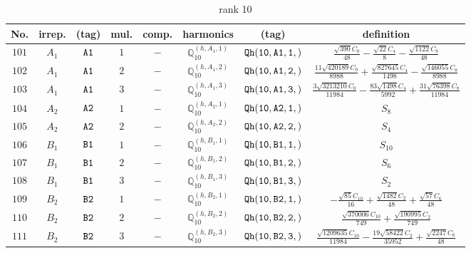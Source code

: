 \documentclass[fleqn,8pt]{jsarticle}
\begin{document}
\begin{table}[ht!]
\begin{center}
\caption{rank 10}
\renewcommand{\arraystretch}{1.3}
\begin{tabular}{cccccccc} \hline \hline
No. & irrep. & (tag) & mul. & comp. & harmonics & (tag) & definition \\ \hline
$ 101 $ & $ A_{1} $ & $ {\tt A1} $ & $ 1 $ & $ - $ & $ \mathbb{Q}_{10}^{(h,A_{1},1)} $ & $ {\tt Qh(10,A1,1,)} $ & $ \frac{\sqrt{390} C_{0}}{48} - \frac{\sqrt{22} C_{4}}{8} - \frac{\sqrt{1122} C_{8}}{48} $ \\
$ 102 $ & $ A_{1} $ & $ {\tt A1} $ & $ 2 $ & $ - $ & $ \mathbb{Q}_{10}^{(h,A_{1},2)} $ & $ {\tt Qh(10,A1,2,)} $ & $ \frac{11 \sqrt{420189} C_{0}}{8988} + \frac{\sqrt{827645} C_{4}}{1498} - \frac{\sqrt{146055} C_{8}}{8988} $ \\
$ 103 $ & $ A_{1} $ & $ {\tt A1} $ & $ 3 $ & $ - $ & $ \mathbb{Q}_{10}^{(h,A_{1},3)} $ & $ {\tt Qh(10,A1,3,)} $ & $ \frac{3 \sqrt{3213210} C_{0}}{11984} - \frac{83 \sqrt{1498} C_{4}}{5992} + \frac{31 \sqrt{76398} C_{8}}{11984} $ \\
$ 104 $ & $ A_{2} $ & $ {\tt A2} $ & $ 1 $ & $ - $ & $ \mathbb{Q}_{10}^{(h,A_{2},1)} $ & $ {\tt Qh(10,A2,1,)} $ & $ S_{8} $ \\
$ 105 $ & $ A_{2} $ & $ {\tt A2} $ & $ 2 $ & $ - $ & $ \mathbb{Q}_{10}^{(h,A_{2},2)} $ & $ {\tt Qh(10,A2,2,)} $ & $ S_{4} $ \\
$ 106 $ & $ B_{1} $ & $ {\tt B1} $ & $ 1 $ & $ - $ & $ \mathbb{Q}_{10}^{(h,B_{1},1)} $ & $ {\tt Qh(10,B1,1,)} $ & $ S_{10} $ \\
$ 107 $ & $ B_{1} $ & $ {\tt B1} $ & $ 2 $ & $ - $ & $ \mathbb{Q}_{10}^{(h,B_{1},2)} $ & $ {\tt Qh(10,B1,2,)} $ & $ S_{6} $ \\
$ 108 $ & $ B_{1} $ & $ {\tt B1} $ & $ 3 $ & $ - $ & $ \mathbb{Q}_{10}^{(h,B_{1},3)} $ & $ {\tt Qh(10,B1,3,)} $ & $ S_{2} $ \\
$ 109 $ & $ B_{2} $ & $ {\tt B2} $ & $ 1 $ & $ - $ & $ \mathbb{Q}_{10}^{(h,B_{2},1)} $ & $ {\tt Qh(10,B2,1,)} $ & $ - \frac{\sqrt{85} C_{10}}{16} + \frac{\sqrt{1482} C_{2}}{48} + \frac{\sqrt{57} C_{6}}{48} $ \\
$ 110 $ & $ B_{2} $ & $ {\tt B2} $ & $ 2 $ & $ - $ & $ \mathbb{Q}_{10}^{(h,B_{2},2)} $ & $ {\tt Qh(10,B2,2,)} $ & $ \frac{\sqrt{370006} C_{10}}{749} + \frac{\sqrt{190995} C_{2}}{749} $ \\
$ 111 $ & $ B_{2} $ & $ {\tt B2} $ & $ 3 $ & $ - $ & $ \mathbb{Q}_{10}^{(h,B_{2},3)} $ & $ {\tt Qh(10,B2,3,)} $ & $ \frac{\sqrt{1209635} C_{10}}{11984} - \frac{19 \sqrt{58422} C_{2}}{35952} + \frac{\sqrt{2247} C_{6}}{48} $ \\

\end{tabular}
\end{center}
\end{table}
\end{document}
